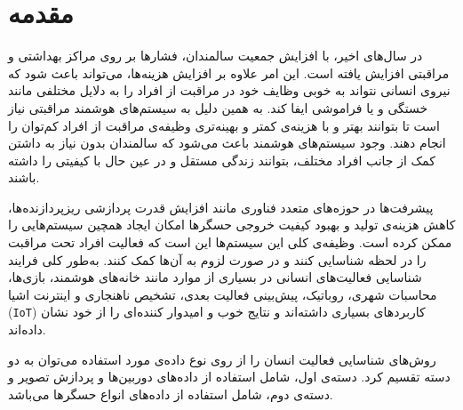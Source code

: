 \chapter{مقدمه}
\clearpage

در سال‌های اخیر، با افزایش جمعیت سالمندان، فشارها بر روی مراکز بهداشتی و مراقبتی افزایش یافته است. این امر علاوه بر افزایش هزینه‌ها، می‌تواند باعث شود که نیروی انسانی نتواند به خوبی وظایف خود در مراقبت از افراد را به دلایل مختلفی مانند خستگی و یا فراموشی ایفا کند. به همین دلیل به سیستم‌های هوشمند مراقبتی نیاز است تا بتوانند بهتر و با هزینه‌ی کمتر و بهینه‌تری وظیفه‌ی مراقبت از افراد کم‌توان را انجام دهند. وجود سیستم‌های هوشمند باعث می‌شود که سالمندان بدون نیاز به داشتن کمک از جانب افراد مختلف، بتوانند زندگی مستقل و در عین حال با کیفیتی را داشته باشند\cite{zhu2015wearable}.

پیشرفت‌ها در حوزه‌های متعدد فناوری مانند افزایش قدرت پردازشی ریزپردازنده‌ها، کاهش هزینه‌ی تولید و بهبود کیفیت خروجی حسگرها امکان ایجاد همچین سیستم‌هایی را ممکن کرده است. وظیفه‌ی کلی این سیستم‌ها این است که فعالیت افراد تحت مراقبت را در لحظه شناسایی کنند و در صورت لزوم به آن‌ها کمک کنند. به‌طور کلی فرایند شناسایی فعالیت‌های انسانی در بسیاری از موارد مانند خانه‌های هوشمند\cite{liao2014detecting}،
بازی‌ها\cite{almeida2017activity}،
محاسبات شهری\cite{zambonelli2011pervasive}،
روباتیک\cite{pereyda2019cyber}،
پیش‌بینی فعالیت بعدی\cite{alaghbari2022activities,jaouedi2020prediction}،
تشخیص ناهنجاری\cite{alaghbari2022activities,zhu2015wearable}
و اینترنت اشیا (\verb;IoT;)\cite{lu2018wearable}
کاربردهای بسیاری داشته‌اند و نتایج خوب و امیدوار کننده‌ای را از خود نشان داده‌اند.

روش‌های شناسایی فعالیت انسان
را از روی نوع داده‌ی مورد استفاده می‌توان به دو دسته تقسیم کرد. دسته‌ی اول، شامل استفاده از داده‌های دوربین‌ها و پردازش تصویر و دسته‌ی دوم، شامل استفاده از داده‌های انواع حسگرها می‌باشد.

